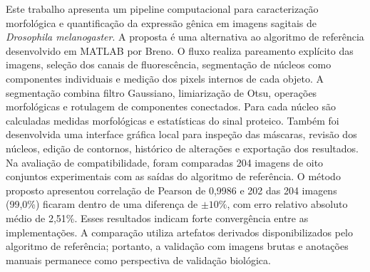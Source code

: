 \documentclass{bsi}
\date{2026}
\begin{document}
	
	\pretextual
	
	\maketitle

	
	
	
	
	\begin{resumo}

Este trabalho apresenta um pipeline computacional para caracterização morfológica e quantificação da expressão gênica em imagens sagitais de \textit{Drosophila melanogaster}. A proposta é uma alternativa ao algoritmo de referência desenvolvido em MATLAB por Breno. O fluxo realiza pareamento explícito das imagens, seleção dos canais de fluorescência, segmentação de núcleos como componentes individuais e medição dos pixels internos de cada objeto. A segmentação combina filtro Gaussiano, limiarização de Otsu, operações morfológicas e rotulagem de componentes conectados. Para cada núcleo são calculadas medidas morfológicas e estatísticas do sinal proteico. Também foi desenvolvida uma interface gráfica local para inspeção das máscaras, revisão dos núcleos, edição de contornos, histórico de alterações e exportação dos resultados. Na avaliação de compatibilidade, foram comparadas 204 imagens de oito conjuntos experimentais com as saídas do algoritmo de referência. O método proposto apresentou correlação de Pearson de 0,9986 e 202 das 204 imagens (99,0\%) ficaram dentro de uma diferença de $\pm 10\%$, com erro relativo absoluto médio de 2,51\%. Esses resultados indicam forte convergência entre as implementações. A comparação utiliza artefatos derivados disponibilizados pelo algoritmo de referência; portanto, a validação com imagens brutas e anotações manuais permanece como perspectiva de validação biológica.

\end{resumo}	
\end{document}
